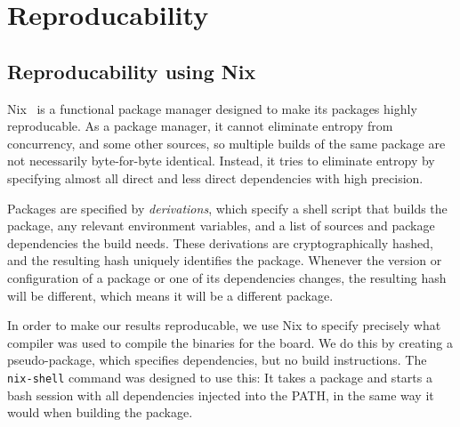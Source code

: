 \section{Reproducability}

\subsection{Reproducability using Nix}

Nix~\cite{nix} is a functional package manager designed to make its packages
highly reproducable. As a package manager, it cannot eliminate entropy from
concurrency, and some other sources, so multiple builds of the same package are
not necessarily byte-for-byte identical. Instead, it tries to eliminate entropy
by specifying almost all direct and less direct dependencies with high
precision.

Packages are specified by \emph{derivations}, which specify a shell script that
builds the package, any relevant environment variables, and a list of sources
and package dependencies the build needs. These derivations are
cryptographically hashed, and the resulting hash uniquely identifies the
package. Whenever the version or configuration of a package or one of its
dependencies changes, the resulting hash will be different, which means it will
be a different package.

In order to make our results reproducable, we use Nix to specify precisely what
compiler was used to compile the binaries for the board. We do this by creating
a pseudo-package, which specifies dependencies, but no build instructions. The
\texttt{nix-shell} command was designed to use this: It takes a package and
starts a bash session with all dependencies injected into the PATH, in the same
way it would when building the package.

